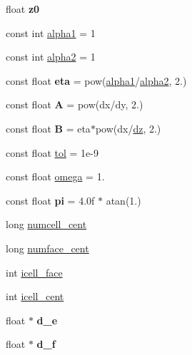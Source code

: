 \begin{DoxyCompactItemize}
float {\bfseries z0}
\item 
const int \hyperlink{classSolver_a1dba41a0d2c04b18cf121e2730a5d2f0}{alpha1} = 1
\item 
const int \hyperlink{classSolver_ac6cd00ae8ed99b0375a15fd0973d674b}{alpha2} = 1
\item 
\mbox{\label{classSolver_af870716dd37bbf5710fde9c9da2c450a}} 
const float {\bfseries eta} = pow(\hyperlink{classSolver_a1dba41a0d2c04b18cf121e2730a5d2f0}{alpha1}/\hyperlink{classSolver_ac6cd00ae8ed99b0375a15fd0973d674b}{alpha2}, 2.)
\item 
\mbox{\label{classSolver_a5744d5828cc41b1981141d780c30b1c4}} 
const float {\bfseries A} = pow(dx/dy, 2.)
\item 
\mbox{\label{classSolver_a0f0aa4fa9d7a1a92453db21b17ad73db}} 
const float {\bfseries B} = eta$\ast$pow(dx/\hyperlink{classSolver_aed4366cb221b3429a878cb39a06b0ef4}{dz}, 2.)
\item 
const float \hyperlink{classSolver_aa97117b666a33e9a70963f0da7fbbcd5}{tol} = 1e-\/9
\item 
const float \hyperlink{classSolver_a5b7c9bb1344ba12a12fbf1820d2b1711}{omega} = 1.
\item 
\mbox{\label{classSolver_ac27a8d6209b24e812b6b17e7f51676eb}} 
const float {\bfseries pi} = 4.\+0f $\ast$ atan(1.)
\item 
long \hyperlink{classSolver_a6d8fd890a91082577b9aab319ffe705b}{numcell\+\_\+cent}
\item 
long \hyperlink{classSolver_a2da3e1b65b167e21ba94610c3c2a8b9e}{numface\+\_\+cent}
\item 
int \hyperlink{classSolver_a6600e00574807ef15d5089110a9d05d0}{icell\+\_\+face}
\item 
int \hyperlink{classSolver_a87eb89d205a491f3c6536163eeac9e3a}{icell\+\_\+cent}
\item 
\mbox{\label{classSolver_ac6207cbb3da30048b6b7da0467371141}} 
float $\ast$ {\bfseries d\+\_\+e}
\item 
\mbox{\label{classSolver_a5591981427d26e6d923b0ac12d333d64}} 
float $\ast$ {\bfseries d\+\_\+f}
\item 
\mbox{\label{classSolver_a270fdfdaa3e0c252d4c1e84c6f2bef50}} 

\end{DoxyCompactItemize}
